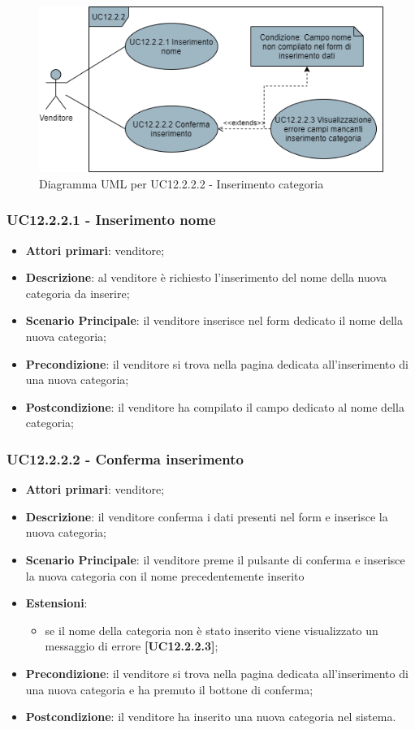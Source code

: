 \begin{figure}[H]
\centering
\includegraphics[scale=0.6]{res/UseCase/Immagini/InserimentoCategoria}
\caption{Diagramma UML per UC12.2.2.2 - Inserimento categoria}
\end{figure}

\subsubsection{UC12.2.2.1 - Inserimento nome}
\begin{itemize}
\item \textbf{Attori primari}: venditore;
\item \textbf{Descrizione}: al venditore è richiesto l'inserimento del nome della nuova categoria da inserire;
\item \textbf{Scenario Principale}: il venditore inserisce nel form dedicato il nome della nuova categoria;
\item \textbf{Precondizione}: il venditore si trova nella pagina dedicata all'inserimento di una nuova categoria;
\item \textbf{Postcondizione}: il venditore ha compilato il campo dedicato al nome della categoria;
\end{itemize}

\subsubsection{UC12.2.2.2 - Conferma inserimento}
\begin{itemize}
\item \textbf{Attori primari}: venditore;
\item \textbf{Descrizione}: il venditore conferma i dati presenti nel form e inserisce la nuova categoria;
\item \textbf{Scenario Principale}: il venditore preme il pulsante di conferma e inserisce la nuova categoria con il nome precedentemente inserito
\item \textbf{Estensioni}: 
\begin{itemize}
	\item se il nome della categoria non è stato inserito viene visualizzato un messaggio di errore \textbf{[UC12.2.2.3]};
\end{itemize} 
\item \textbf{Precondizione}: il venditore si trova nella pagina dedicata all'inserimento di una nuova categoria e ha premuto il bottone di conferma;
\item \textbf{Postcondizione}: il venditore ha inserito una nuova categoria nel sistema.
\end{itemize}

